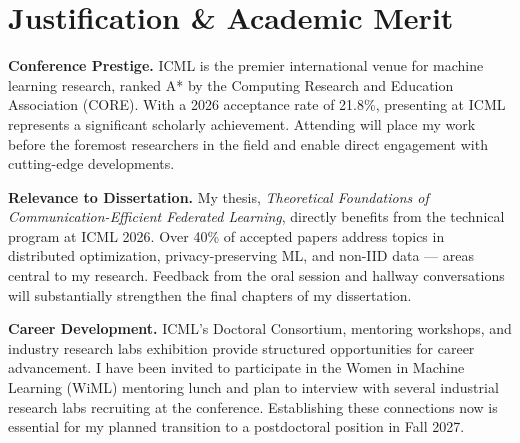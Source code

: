 \section{\faPen\hspace{7pt}Justification \& Academic Merit}

\textbf{Conference Prestige.}
ICML is the premier international venue for machine learning research, ranked A* by the Computing Research and Education Association (CORE). With a 2026 acceptance rate of 21.8\%, presenting at ICML represents a significant scholarly achievement. Attending will place my work before the foremost researchers in the field and enable direct engagement with cutting-edge developments.

\vspace{3pt}

\textbf{Relevance to Dissertation.}
My thesis, \textit{Theoretical Foundations of Communication-Efficient Federated Learning}, directly benefits from the technical program at ICML 2026. Over 40\% of accepted papers address topics in distributed optimization, privacy-preserving ML, and non-IID data --- areas central to my research. Feedback from the oral session and hallway conversations will substantially strengthen the final chapters of my dissertation.

\vspace{3pt}

\textbf{Career Development.}
ICML's Doctoral Consortium, mentoring workshops, and industry research labs exhibition provide structured opportunities for career advancement. I have been invited to participate in the Women in Machine Learning (WiML) mentoring lunch and plan to interview with several industrial research labs recruiting at the conference. Establishing these connections now is essential for my planned transition to a postdoctoral position in Fall 2027.

\vspace{2pt}

